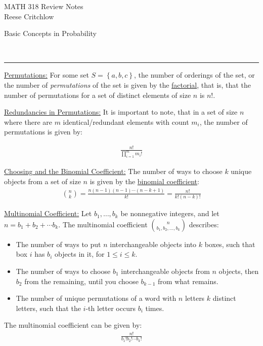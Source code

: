 \documentclass{article}
\newcommand{\header}[1]{\begin{large}\noindent #1\end{large}\\\rule{\textwidth}{0.5pt}}
\newcommand{\sheader}[1]{\underline{#1:}}
\newcommand{\curly}[1]{\left\{#1\right\}}
\begin{document}
\begin{center}
        \Large MATH 318 Review Notes\\
        \normalsize Reese Critchlow
\end{center}


\header{Basic Concepts in Probability}

\sheader{Permutations} For some set $S = \curly{a, b, c}$, the number of orderings of the set, or 
the number of \textit{permutations} of the set is given by the \underline{factorial}, that is, that
the number of permutations for a set of distinct elements of size $n$ is $n!$.

\sheader{Redundancies in Permutations} It is important to note, that in a set of size $n$ where there are $m$ identical/redundant
elements with count $m_i$, the number of permutations is given by:

\begin{align*}
    \frac{n!}{\prod_{i=1}^{m} m_i!}
\end{align*}

\sheader{Choosing and the Binomial Coefficient} The number of ways to choose $k$ unique objects from a set of size
$n$ is given by the \underline{binomial coefficient}:
\begin{align*}
    \binom{n}{k} = \frac{n(n-1)(n - 1) \cdots (n - k + 1)}{k!} = \frac{n!}{k!(n-k)!}
\end{align*}

\sheader{Multinomial Coefficient} Let $b_1, \ldots, b_k$ be nonnegative integers, and let $n = b_1 + b_2 + \cdots b_k$.
The multinomial coefficient $\binom{n}{b_1, b_2, \ldots, b_k}$ describes:
\begin{itemize}
    \item The number of ways to put $n$ interchangeable objects into $k$ boxes, such that box $i$ has $b_i$ 
    objects in it, for $1 \leq i \leq k$.
    \item The number of ways to choose $b_1$ interchangeable objects from $n$ objects, then $b_2$ from the remaining,
    until you choose $b_{k-1}$ from what remains.
    \item The number of unique permutations of a word with $n$ letters $k$ distinct letters, such that the
    $i$-th letter occurs $b_i$ times.
\end{itemize}
The multinomial coefficient can be given by:
\begin{align*}
    \frac{n!}{b_1!b_2!\cdots b_k!}
\end{align*}
\end{document}

